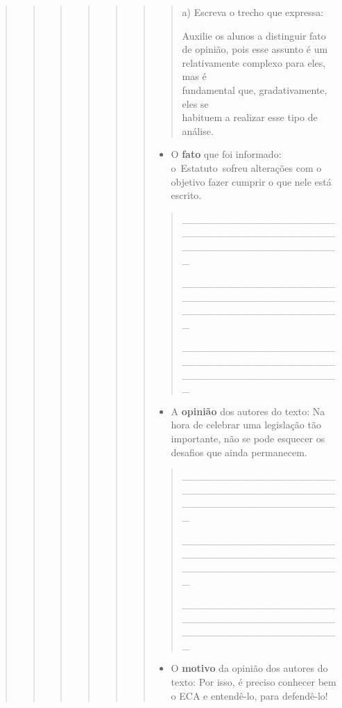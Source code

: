 \begin{quote}
\begin{quote}
\begin{quote}
\begin{quote}
\begin{quote}
\begin{quote}
\begin{quote}
a) Escreva o trecho que expressa:

Auxilie os alunos a distinguir fato de opinião, pois esse assunto é um
relativamente complexo para eles, mas é\\
fundamental que, gradativamente, eles se\\
habituem a realizar esse tipo de análise.
\end{quote}

\begin{itemize}
\item
  O \textbf{fato} que foi informado: o~Estatuto~sofreu alterações com o
  objetivo fazer cumprir o que nele está escrito.
\end{itemize}

\begin{quote}
\_\_\_\_\_\_\_\_\_\_\_\_\_\_\_\_\_\_\_\_\_\_\_\_\_\_\_\_\_\_\_\_\_\_\_\_\_\_\_\_\_\_\_\_\_\_\_\_\_\_\_\_\_\_\_\_\_\_\_\_\_\_\_\_

\_\_\_\_\_\_\_\_\_\_\_\_\_\_\_\_\_\_\_\_\_\_\_\_\_\_\_\_\_\_\_\_\_\_\_\_\_\_\_\_\_\_\_\_\_\_\_\_\_\_\_\_\_\_\_\_\_\_\_\_\_\_\_\_

\_\_\_\_\_\_\_\_\_\_\_\_\_\_\_\_\_\_\_\_\_\_\_\_\_\_\_\_\_\_\_\_\_\_\_\_\_\_\_\_\_\_\_\_\_\_\_\_\_\_\_\_\_\_\_\_\_\_\_\_\_\_\_\_
\end{quote}

\begin{itemize}
\item
  A \textbf{opinião} dos autores do texto: Na hora de celebrar uma
  legislação tão importante, não se pode esquecer os desafios que ainda
  permanecem.
\end{itemize}

\begin{quote}
\_\_\_\_\_\_\_\_\_\_\_\_\_\_\_\_\_\_\_\_\_\_\_\_\_\_\_\_\_\_\_\_\_\_\_\_\_\_\_\_\_\_\_\_\_\_\_\_\_\_\_\_\_\_\_\_\_\_\_\_\_\_\_\_

\_\_\_\_\_\_\_\_\_\_\_\_\_\_\_\_\_\_\_\_\_\_\_\_\_\_\_\_\_\_\_\_\_\_\_\_\_\_\_\_\_\_\_\_\_\_\_\_\_\_\_\_\_\_\_\_\_\_\_\_\_\_\_\_

\_\_\_\_\_\_\_\_\_\_\_\_\_\_\_\_\_\_\_\_\_\_\_\_\_\_\_\_\_\_\_\_\_\_\_\_\_\_\_\_\_\_\_\_\_\_\_\_\_\_\_\_\_\_\_\_\_\_\_\_\_\_\_\_
\end{quote}

\begin{itemize}
\item
  O \textbf{motivo} da opinião dos autores do texto: Por isso, é preciso
  conhecer bem o ECA e entendê-lo, para defendê-lo!
\end{itemize}


\end{quote}
\end{quote}
\end{quote}
\end{quote}
\end{quote}
\end{quote}
